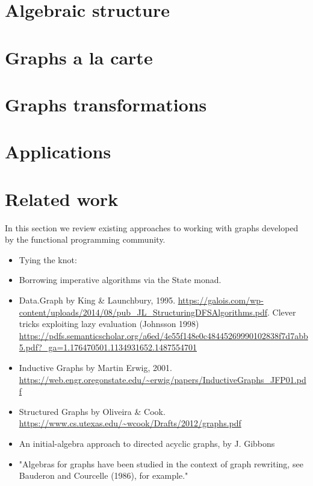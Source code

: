 \documentclass[acmlarge,anonymous]{acmart}\settopmatter{printfolios=true}
\begin{document}
\section{Algebraic structure\label{sec-algebra}}

\section{Graphs a la carte\label{sec-a-la-carte}}

\section{Graphs transformations\label{sec-transformations}}

\section{Applications\label{sec-applications}}

\section{Related work\label{sec-related}}

In this section we review existing approaches to working with graphs developed
by the functional programming community.

\begin{itemize}
    \item Tying the knot:
    \item Borrowing imperative algorithms via the State monad.
    \item Data.Graph by King & Launchbury, 1995. \url{https://galois.com/wp-content/uploads/2014/08/pub_JL_StructuringDFSAlgorithms.pdf}.
    Clever tricks exploiting lazy evaluation (Johnsson 1998) \url{https://pdfs.semanticscholar.org/a6ed/4e55f148e0c48445269990102838f7d7abb5.pdf?_ga=1.176470501.1134931652.1487554701}

    \item Inductive Graphs by Martin Erwig, 2001. \url{https://web.engr.oregonstate.edu/~erwig/papers/InductiveGraphs_JFP01.pdf}
    \item Structured Graphs by Oliveira & Cook. \url{https://www.cs.utexas.edu/~wcook/Drafts/2012/graphs.pdf}
    \item An initial-algebra approach to directed acyclic graphs, by J. Gibbons
    \item "Algebras for graphs have been studied in the context of graph rewriting, see Bauderon and Courcelle (1986), for example."
\end{itemize}
\end{document}
